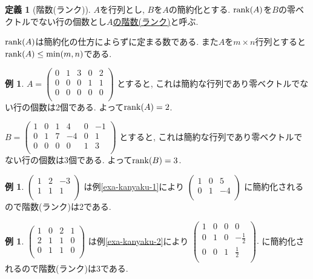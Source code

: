 \documentclass[dvipdfmx,a4paper,11pt]{article}
\theoremstyle{definition}
\newtheorem{dfn}[thm]{定義}
\newtheorem{exa}[thm]{例}
\begin{document}
 
  \begin{tcolorbox}[
    colback = white,
    colframe = green!35!black,
    fonttitle = \bfseries,
    breakable = true]
    \begin{dfn}[階数(ランク)]
$A$を行列とし, $B$を$A$の簡約化とする.
${\rm rank}(A)$を$B$の零ベクトルでない行の個数とし\underline{$A$の階数(ランク)}と呼ぶ.
   \end{dfn}
 \end{tcolorbox}
${\rm rank}(A)$は簡約化の仕方によらずに定まる数である.
また$A$を$m\times n$行列とすると${\rm rank}(A) \le \min(m,n)$である.


 
 \begin{exa}
$A=
 \begin{pmatrix}
 0& 1& 3  & 0&2\\
 0& 0& 0  & 1&1\\
 0& 0& 0 & 0&0\\
 \end{pmatrix}
 $
 とすると, これは簡約な行列であり零ベクトルでない行の個数は2個である. よって${\rm rank}(A)=2$.
 
 $B= \begin{pmatrix}
 1& 0& 1  & 4&0&-1\\
 0& 1& 7 & -4&0&1\\
 0& 0& 0 & 0&1&3\\
 \end{pmatrix}
 $ とすると, これは簡約な行列であり零ベクトルでない行の個数は3個である. よって${\rm rank}(B)=3$.
\end{exa}

\begin{exa}
$
 \begin{pmatrix}
 1& 2& -3  \\
 1& 1& 1  \\
 \end{pmatrix}
 $
 は例\ref{exa-kanyaku-1}により
 $
    \begin{pmatrix}
 1& 0& 5  \\
 0& 1& -4  \\
 \end{pmatrix}
 $
 に簡約化されるので階数(ランク)は2である.
\end{exa}

\begin{exa}
$
 \begin{pmatrix}
 1& 0& 2  &1\\
 2& 1& 1  &0\\
 0& 1& 1  &0\\
 \end{pmatrix}
 $
 は例\ref{exa-kanyaku-2}により
 $
  \begin{pmatrix}
 1& 0& 0  &0\\
 0& 1& 0 &-\frac{1}{2}\\
 0& 0& 1 &\frac{1}{2}\\
 \end{pmatrix}.
 $
 に簡約化されるので階数(ランク)は3である.
\end{exa}
\end{document}
